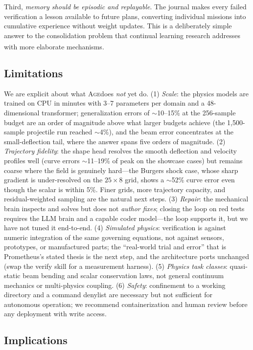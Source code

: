 \documentclass[11pt,a4paper]{article}
\newcommand{\Age}{\textsc{Age}}
\newcommand{\pn}{\textsuperscript}
\begin{document}
Third, \emph{memory should be episodic and replayable}. The journal makes
every failed verification a lesson available to future plans, converting
individual missions into cumulative experience without weight updates. This
is a deliberately simple answer to the consolidation problem that continual
learning research addresses with more elaborate
mechanisms\pn{\citep{kirkpatrick2017}}.

\subsection{Limitations}

We are explicit about what \Age does \emph{not} yet do. (1) \emph{Scale}: the
physics models are trained on CPU in minutes with 3--7 parameters per domain
and a 48-dimensional transformer; generalization errors of $\sim$10--15\%
at the 256-sample budget are an order of magnitude above what larger budgets
achieve (the 1,500-sample projectile run reached $\sim$4\%), and the beam
error concentrates at the small-deflection tail, where the answer spans
five orders of magnitude. (2) \emph{Trajectory fidelity}: the shape head
resolves the smooth deflection and velocity profiles well (curve errors
$\sim$11--19\% of peak on the showcase cases) but remains coarse where the
field is genuinely hard---the Burgers shock case, whose sharp gradient is
under-resolved on the $25\times8$ grid, shows a $\sim$52\% curve error even
though the scalar is within 5\%. Finer grids, more trajectory capacity, and
residual-weighted sampling are the natural next steps. (3) \emph{Repair}:
the mechanical
brain inspects and solves but does not \emph{author fixes}; closing the loop
on red tests requires the LLM brain and a capable coder model---the loop
supports it, but we have not tuned it end-to-end. (4) \emph{Simulated
physics}: verification is against numeric integration of the same governing
equations, not against sensors, prototypes, or manufactured parts; the
``real-world trial and error'' that is Prometheus's stated thesis is the
next step, and the architecture ports unchanged (swap the verify skill for a
measurement harness). (5) \emph{Physics task classes}: quasi-static beam
bending and scalar conservation laws, not general continuum mechanics or
multi-physics coupling. (6)
\emph{Safety}: confinement to a working directory and a command denylist are
necessary but not sufficient for autonomous operation; we recommend
containerization and human review before any deployment with write access.

\subsection{Implications}
\end{document}
